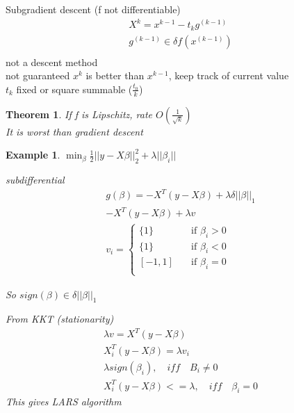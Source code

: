 \documentclass[10pt]{article}
\newcounter{lecnum}
\newtheorem{theorem}{Theorem}[lecnum]
\newtheorem{example}[ex]{Example}
\begin{document}
Subgradient descent (f not differentiable) \\
\begin{equation}
\begin{aligned}
	X^k = x^{k-1} - t_kg^{(k-1)} \\
	g^{(k-1)} \in \delta f(x^{(k-1)})  \\
\end{aligned}
\end{equation}
not a descent method \\
not guaranteed $x^k$ is better than $x^{k-1}$, keep track of current value \\
$t_k$ fixed or square summable ($\frac{t_0}{k}$)

\begin{theorem}
If f is Lipschitz, rate $O(\frac{1}{\sqrt{k}})$ \\
It is worst than gradient descent
\end{theorem}

\begin{example}
$\min_{\beta} \frac{1}{2}||y - X\beta||_2^2 + \lambda||\beta_i||$

subdifferential  \\
\begin{equation}
\begin{aligned}
	g(\beta) = -X^T(y - X\beta) + \lambda\delta||\beta||_1 \\
	-X^T(y - X\beta) + \lambda v \\
    v_i =
    \begin{cases}
    	\{1\}      & \quad \text{if } \beta_i > 0\\
    	\{1\}	   & \quad \text{if } \beta_i < 0\\
        [-1,1]     & \quad \text{if } \beta_i = 0\\
    \end{cases}
\end{aligned}
\end{equation}

So $sign(\beta) \in \delta||\beta||_1$ 

From KKT (stationarity) \\
\begin{equation}
\begin{aligned}
	\lambda v = X^T(y - X\beta) \\
	X_i^{T}(y - X\beta) = \lambda v_i \\
	\lambda sign(\beta_i) , \quad iff \quad B_i \neq 0 \\
	X_i^T(y - X\beta) <= \lambda, \quad iff \quad \beta_i = 0
\end{aligned}
\end{equation}
This gives LARS algorithm
\end{example}
\end{document}
